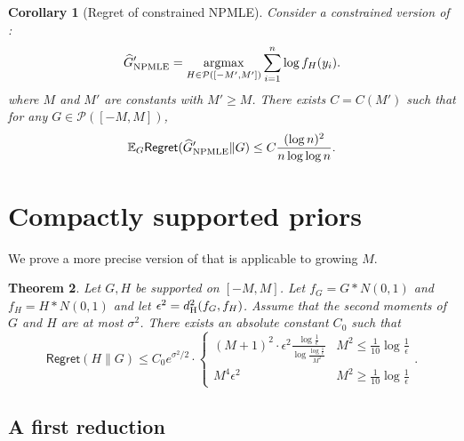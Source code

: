 \documentclass[letterpaper,11pt]{article}
\def\argmax{\mathop{\rm argmax}}
\newcommand{\hellinger}{d_{\rm H}}
\newcommand{\calP}{{\mathcal{P}}}
\newtheorem{theorem}{Theorem}
\newtheorem{corollary}[theorem]{Corollary}
\theoremstyle{definition}
\newcommand{\GNPMLE}{\hat G_{\rm NPMLE}}
\newcommand{\Regret}{\mathsf{Regret}}
\renewcommand{\hat}{\widehat}
\begin{document}
\begin{corollary}[Regret of constrained NPMLE]
\label{cor:npmle-regret}
Consider a constrained version of :    %
\begin{equation}
\GNPMLE'
= \argmax_{H \in \calP([-M',M'])} \sum_{i=1}^n \log f_H(y_i).
    \label{eq:NPMLE-constrained}
\end{equation}
where $M$ and $M'$ are constants with $M'\geq M$. There exists $C=C(M')$ such that for any
$G\in\mathcal P([-M,M])$,
\[
\mathbb E_{G}\Regret(\GNPMLE'\|G)
\le
C \frac{(\log n)^2}{n\log\log n}.
\]
\end{corollary}










\section{Compactly supported priors}
\label{sec:compact}

We prove a more precise version of 
that is applicable to growing $M$. 

    \begin{theorem}
      \label{thm:ub-compact}
      Let $G,H$ be supported on $[-M,M]$.
      Let $f_G = G * N(0,1)$ and $f_H = H * N(0,1)$ and let $\epsilon^2 = \hellinger^2
      (f_G, f_H)$.
      Assume that the second moments of $G$ and $H$ are at most $\sigma^2$.
      There exists an absolute constant $C_0$ such that
      \[
        \Regret(H\|G)
        \leq
        C_0 e^{\sigma^2/2}  \cdot
        \begin{cases}
          (M+1)^2 \cdot
          \epsilon^2 \frac{\log \frac{1}{\epsilon}}{\log \frac{\log \frac{1}{\epsilon}}
          {M^2}} &
          M^2 \leq \frac{1}{10} \log\frac{1}{\epsilon} \\
          M^4 \epsilon^2 &
          M^2 \geq \frac{1}{10} \log\frac{1}{\epsilon}
        \end{cases}. 
      \]
    \end{theorem}







    \subsection{A first reduction}
\end{document}
